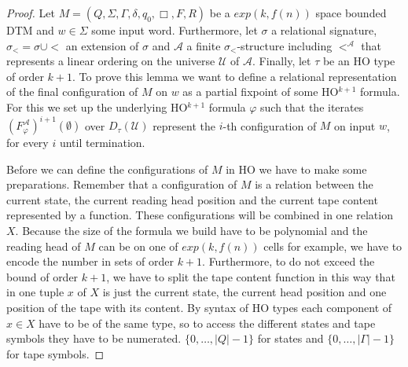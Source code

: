 \begin{proof}
    Let $M = (Q, \Sigma, \Gamma, \delta, q_0, \Box, F, R)$ be a $exp(k, f(n))$ space bounded DTM and $w
    \in \Sigma$ some input word. Furthermore, let $\sigma$ a relational signature, $\sigma_< = \sigma \cup
    <$ an extension of $\sigma$ and $\mathcal{A}$ a finite $\sigma_<$-structure including $<^\mathcal{A}$ that
    represents a linear ordering on the universe $\mathcal{U}$ of $\mathcal{A}$. Finally, let $\tau$ be an HO type of
    order $k + 1$.
    To prove this lemma we want to define a relational representation of the final configuration of $M$ on $w$
    as a partial fixpoint of some HO$^{k+1}$ formula. For this we set up the underlying HO$^{k+1}$ formula
    $\varphi$ such that the iterates $(F_\varphi^\mathcal{A})^{i+1}(\emptyset)$ over $D_\tau
    (\mathcal{U})$ represent the $i$-th configuration of $M$ on input $w$, for every $i$ until termination.

    Before we can define the configurations of $M$ in HO we have to make some preparations. Remember that a
    configuration of $M$ is a relation between the current state, the current reading head position and
    the current tape content represented by a function. These configurations will be combined in one relation $X$.
    Because the size of the formula we build have to be polynomial and the reading head of $M$ can be on
    one of $exp(k, f(n))$ cells for example, we have to encode the number in sets of order $k + 1$. Furthermore, to do
    not exceed the bound of order $k + 1$, we have to split the tape content function in this way that in one tuple
    $x$ of $X$ is just the current state, the current head position and one position of the tape with its content. By
    syntax of HO types each component of $x \in X$ have to be of the same type, so to access the different states and
    tape symbols they have to be numerated. $\{0, \dots, |Q| - 1\}$ for states and $\{0, \dots, |\Gamma| - 1\}$ for tape
    symbols.


\end{proof}
